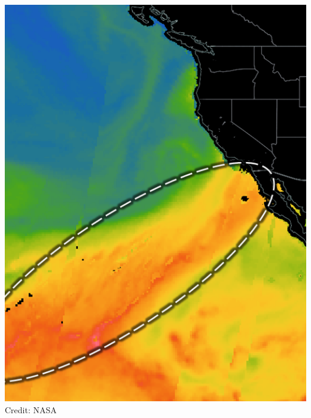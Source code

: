 \documentclass[aspectratio=169,10pt,notes]{beamer}
\begin{document}
\begin{frame}
\begin{minipage}{.35\textwidth}
    \includegraphics[width=\textwidth]{./ch1/images/ar}\\
    {\scriptsize Credit: NASA}
    \end{minipage}
\end{frame} %
\end{document}
